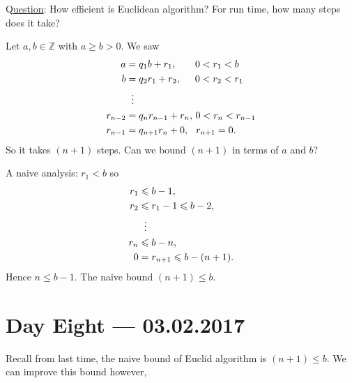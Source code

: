 \documentclass{amsbook}
\theoremstyle{plain}
\theoremstyle{definition}
\theoremstyle{remark}
\numberwithin{equation}{chapter}
\numberwithin{figure}{chapter}
\newcommand{\Z}{\mathbb{Z}}
\begin{document}
Q\underline{uestion}: How efficient is Euclidean algorithm? For run time, how many steps does it take?

Let $a, b \in \Z$ with $a \geqslant b > 0$. We saw 
\begin{align}
a &= q_1 b   + r_1, \hspace{6.7mm} 0 < r_1 < b \\
b &= q_2 r_1 + r_2, \hspace{5mm} 0 < r_2 < r_1 \\
& \hspace{2mm} \vdots \\ 
r_{n-2} &= q_n r_{n-1} + r_n, \, 0 < r_n < r_{n-1} \\
r_{n-1} &= q_{n+1} r_n + 0, \hspace{2.5mm} r_{n+1} = 0.
\end{align}
So it takes $(n+1)$ steps. Can we bound $(n+1)$ in terms of $a$ and $b$?

A naive analysis: $r_1 < b$ so 
\begin{align}
r_1 &\leqslant b - 1, \\
r_2 &\leqslant r_1 - 1 \leqslant b - 2, \\
& \hspace{2mm} \vdots \\ 
r_n &\leqslant b - n,\\
0 &= r_{n+1} \leqslant b - (n+1).
\end{align}
Hence $n \leqslant b - 1$. The naive bound $(n+1) \leqslant b$.

\chapter[Lecture Eight]{Day Eight \hfill {\footnotesize \rm --- 03.02.2017}}

Recall from last time, the naive bound of Euclid algorithm is $(n+1) \leqslant b$. We can improve this bound however, 
\end{document}
